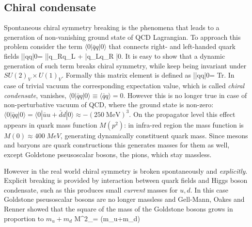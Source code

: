 	\subsection*{Chiral condensate}
Spontaneous chiral symmetry breaking is the phenomena that leads to a generation of non-vanishing ground state of QCD Lagrangian. To approach this problem consider the term $\langle0|\bar{q}q|0\rangle$ that connects right- and left-handed quark fields
\beqa
	|\bar{q}q|0\rangle = |\bar{q_R}q_L + \bar{q_L}q_R |0\rangle\;.
\eeqa
It is easy to show that a dynamic generation of such term breaks chiral symmetry, while keep being invariant under $SU(2)_V \times U(1)_V$. Formally this matrix element is defined as
\beqa
	|\bar{q}q|0\rangle = \int {} Tr\left[  S(k) \right] \;.
\eeqa
In case of trivial vacuum the corresponding expectation value, which is called \textit{chiral condensate}, vanishes, $\langle0|\bar{q}q|0\rangle \equiv \langle\bar{q}q\rangle = 0$. However this is no longer true in case of non-perturbative vacuum of QCD, where the ground state is non-zero: $\langle0|\bar{q}q|0\rangle = \langle0|\bar{u}u + \bar{d}d|0\rangle \approx -(250 \; \text{MeV})^3$. On the propagator level this effect appears in quark mass function $M(p^2)$: in infra-red region the mass function is $M(0)\approx 400 \; MeV$, generating dynamically constituent quark mass. Since mesons and baryons are quark constructions this generates masses for them as well, except Goldstone pseusoscalar bosons, the pions, which stay massless.

However in the real world chiral symmetry is broken spontaneously and \textit{explicitly}. Explicit breaking is provided by interaction between quark fields and Higgs boson condensate, such as this produces small \textit{current} masses for $u,d$. In this case Goldstone pseusoscalar bosons are no longer massless and Gell-Mann, Oakes and Renner \cite{GellMann:1968rz} showed that the square of the mass of the Goldstone bosons grows in proportion to $m_u + m_d$
\beqa
	\label{qcd_low:GMOR}
	M^2_\pi = (m_u+m_d)
\eeqa

